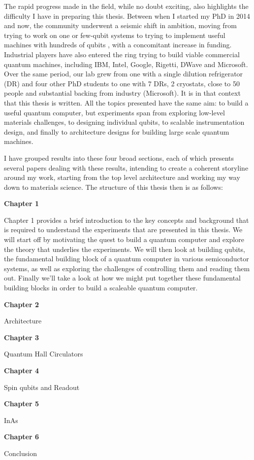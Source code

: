 The rapid progress made in the field, while no doubt exciting, also highlights the difficulty I have in
preparing this thesis. Between when I started my PhD in 2014 and now, the community underwent a seismic
shift in ambition, moving from trying to work on one or few-qubit systems \cite{iarpa_mqco} to trying
to implement useful machines with hundreds of qubits \cite{Monroe440}, with a concomitant increase in
funding. Industrial players have also
entered the ring trying to build viable commercial quantum machines, including IBM, Intel, Google, Rigetti,
DWave and Microsoft. Over the same period, our lab grew from one with a single dilution refrigerator (DR) and
four other PhD students to one with 7 DRs, 2 cryostats, close to 50 people and substantial backing
from industry (Microsoft). It is in that context that this thesis is written. All the topics presented have the
same aim: to build a useful quantum computer, but experiments span from exploring low-level materials challenges,
to designing individual qubits, to scalable instrumentation design, and finally to architecture
designs for building large scale quantum machines.

I have grouped results into these four broad sections, each of which presents several papers dealing
with these results, intending to create a coherent storyline around my work, starting from the top
level architecture and working my way down to materials science. The structure of this
thesis then is as follows:

\medskip
\noindent\textbf{Chapter 1}

\noindent
Chapter 1 provides a brief introduction to the key concepts and background that is required to understand
the experiments that are presented in this thesis. We will start off by motivating the quest to build a quantum
computer and explore the theory that underlies the experiments. We will then look at building qubits,
the fundamental building block of a quantum computer in various semiconductor systems, as well as exploring
the challenges of controlling them and reading them out. Finally we'll take a look at how we might put
together these fundamental building blocks in order to build a scaleable quantum computer.

\medskip
\noindent\textbf{Chapter 2}

\noindent
Architecture

\medskip
\noindent\textbf{Chapter 3}

\noindent
Quantum Hall Circulators

\medskip
\noindent\textbf{Chapter 4}

\noindent
Spin qubits and Readout

\medskip
\noindent\textbf{Chapter 5}

\noindent
InAs

\medskip
\noindent\textbf{Chapter 6}

\noindent
Conclusion


